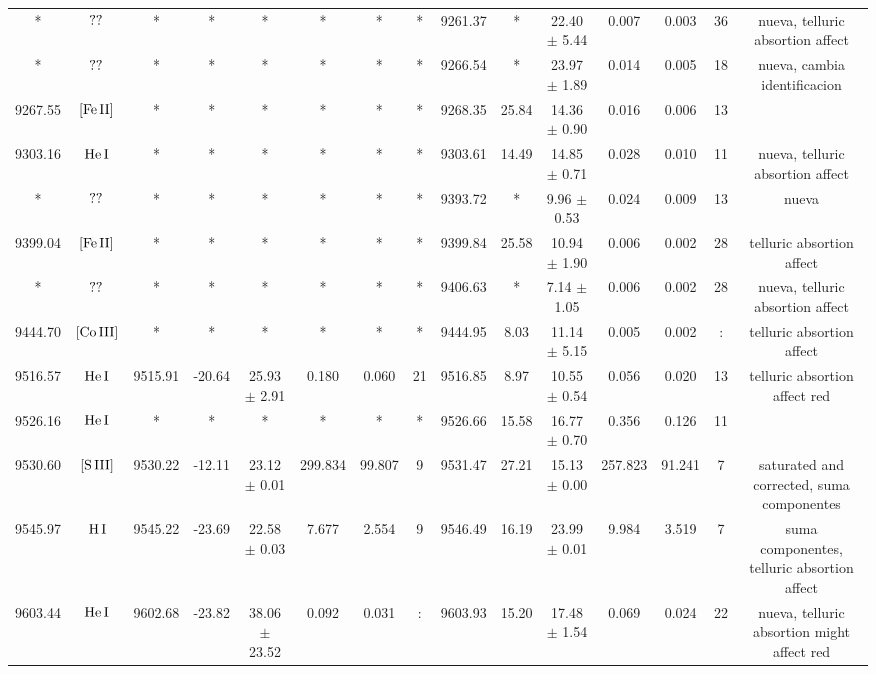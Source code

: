 \documentclass{article}
\begin{document}
\begin{table*}
\begin{adjustbox}{width=\textwidth}
\begin{tabular}{ccccccccccccccc}
* & $\mbox{??}\thinspace \mbox{}$ & * & * & * & * & * & * & 9261.37 & * & 22.40 $\pm$ 5.44 & 0.007 & 0.003 & 36 &  nueva, telluric absortion affect \\
* & $\mbox{??}\thinspace \mbox{}$ & * & * & * & * & * & * & 9266.54 & * & 23.97 $\pm$ 1.89 & 0.014 & 0.005 & 18 &  nueva, cambia identificacion \\
9267.55 & $\mbox{[Fe}\thinspace \mbox{II]}$ & * & * & * & * & * & * & 9268.35 & 25.84 & 14.36 $\pm$ 0.90 & 0.016 & 0.006 & 13 &  \\
9303.16 & $\mbox{He}\thinspace \mbox{I}$ & * & * & * & * & * & * & 9303.61 & 14.49 & 14.85 $\pm$ 0.71 & 0.028 & 0.010 & 11 &  nueva, telluric absortion affect \\
* & $\mbox{??}\thinspace \mbox{}$ & * & * & * & * & * & * & 9393.72 & * & 9.96 $\pm$ 0.53 & 0.024 & 0.009 & 13 &  nueva \\
9399.04 & $\mbox{[Fe}\thinspace \mbox{II]}$ & * & * & * & * & * & * & 9399.84 & 25.58 & 10.94 $\pm$ 1.90 & 0.006 & 0.002 & 28 &  telluric absortion affect \\
* & $\mbox{??}\thinspace \mbox{}$ & * & * & * & * & * & * & 9406.63 & * & 7.14 $\pm$ 1.05 & 0.006 & 0.002 & 28 &  nueva, telluric absortion affect \\
9444.70 & $\mbox{[Co}\thinspace \mbox{III]}$ & * & * & * & * & * & * & 9444.95 & 8.03 & 11.14 $\pm$ 5.15 & 0.005 & 0.002 & : &  telluric absortion affect \\
9516.57 & $\mbox{He}\thinspace \mbox{I}$ & 9515.91 & -20.64 & 25.93 $\pm$ 2.91 & 0.180 & 0.060 & 21 & 9516.85 & 8.97 & 10.55 $\pm$ 0.54 & 0.056 & 0.020 & 13 &  telluric absortion affect red \\
9526.16 & $\mbox{He}\thinspace \mbox{I}$ & * & * & * & * & * & * & 9526.66 & 15.58 & 16.77 $\pm$ 0.70 & 0.356 & 0.126 & 11 &  \\
9530.60 & $\mbox{[S}\thinspace \mbox{III]}$ & 9530.22 & -12.11 & 23.12 $\pm$ 0.01 & 299.834 & 99.807 & 9 & 9531.47 & 27.21 & 15.13 $\pm$ 0.00 & 257.823 & 91.241 & 7 &  saturated and corrected, suma componentes \\
9545.97 & $\mbox{H}\thinspace \mbox{I}$ & 9545.22 & -23.69 & 22.58 $\pm$ 0.03 & 7.677 & 2.554 & 9 & 9546.49 & 16.19 & 23.99 $\pm$ 0.01 & 9.984 & 3.519 & 7 &  suma componentes, telluric absortion affect \\
9603.44 & $\mbox{He}\thinspace \mbox{I}$ & 9602.68 & -23.82 & 38.06 $\pm$ 23.52 & 0.092 & 0.031 & : & 9603.93 & 15.20 & 17.48 $\pm$ 1.54 & 0.069 & 0.024 & 22 &  nueva, telluric absortion might affect red \\

\end{tabular}
\end{adjustbox}
\end{table*}
\end{document}
